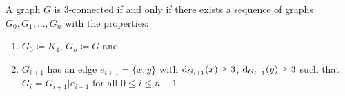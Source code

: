 \documentclass[aagt.tex]{subfiles}
\begin{document}
\begin{theorem}[Tutte 1061]
  A graph $G$ is 3-connected if and only if there exists a sequence of graphs $G_0,G_1,\dots,G_n$ with the properties:
  \begin{enumerate}[label=(\alph*)]
    \item $G_0 \coloneqq K_4$, $G_n \coloneqq G$ and
    \item $G_{i+1}$ has an edge $e_{i+1} = \{x,y\}$ with $\operatorname{d}_{G_{i+1}}(x) \geq 3$, $\operatorname{d}_{G_{i+1}}(y) \geq3$ such that $G_i = G_{i+1}|e_{i+1}$ for all $0 \leq i \leq n-1$
  \end{enumerate}
\end{theorem}
\end{document}
